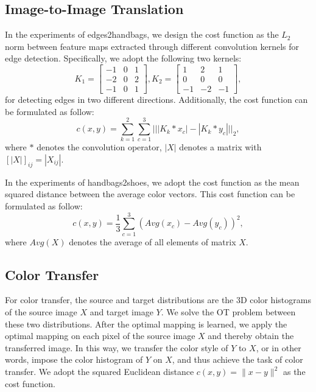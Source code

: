\documentclass[runningheads]{llncs}
\begin{document}
\subsection{Image-to-Image Translation}
In the experiments of edges2handbags, we design the cost function as the $L_2$ norm between feature maps extracted through different convolution kernels for edge detection.
Specifically, we adopt the following two kernels:
\begin{equation*}
K_1 = \begin{bmatrix} 
-1 & 0 & 1 \\
-2 & 0 & 2 \\
-1 & 0 & 1	 
\end{bmatrix},
K_2 = \begin{bmatrix} 
1 & 2 & 1 \\
0 & 0 & 0 \\
-1 & -2 & -1	 
\end{bmatrix},
\end{equation*}
for detecting edges in two different directions.
Additionally, the cost function can be formulated as follow:
\begin{equation*}
c(x, y) = \sum_{k=1}^2\sum_{c=1}^3|||K_k * x_c| - |K_k * y_c|||_2,
\end{equation*}
where $*$ denotes the convolution operator, $|X|$ denotes a matrix with $[|X|]_{ij} = |X_{ij}|$.

In the experiments of handbags2shoes, we adopt the cost function as the mean squared distance between the average color vectors. This cost function can be formulated as follow:
\begin{equation*}
c(x, y) = \frac{1}{3} \sum_{c=1}^3 (Avg(x_c)-Avg(y_c))^2,
\end{equation*}
where $Avg(X)$ denotes the average of all elements of matrix $X$.

\subsection{Color Transfer}

For color transfer, the source and target distributions are the 3D color histograms of the source image $X$ and target image $Y$. We solve the OT problem between these two distributions. After the optimal mapping is learned, we apply the optimal mapping on each pixel of the source image $X$ and thereby obtain the transferred image. In this way, we transfer the color style of $Y$ to $X$, or in other words, impose the color histogram of $Y$ on $X$, and thus achieve the task of color transfer. We adopt the squared Euclidean distance $c(x, y) = \| x - y \| ^ 2$ as the cost function. 
\end{document}
